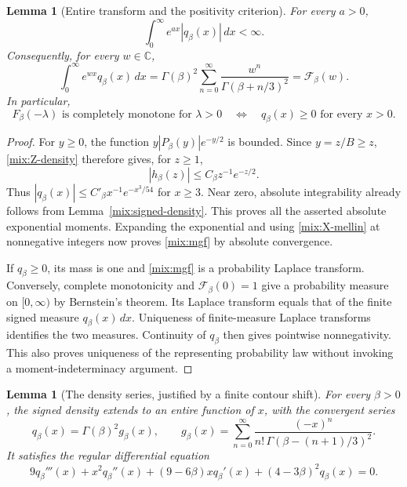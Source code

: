 \documentclass[11pt,a4paper]{article}
\numberwithin{equation}{section}
\newtheorem{lemma}[theorem]{Lemma}
\theoremstyle{definition}\newtheorem{definition}[theorem]{Definition}
\theoremstyle{remark}\newtheorem{remark}[theorem]{Remark}
\begin{document}
\begin{lemma}[Entire transform and the positivity criterion]
\label{mix:entire-transform}
For every \(a>0\),
\[
              \int_0^\infty e^{ax}|q_\beta(x)|\,dx<\infty.
\]
Consequently, for every \(w\in\mathbb C\),
\begin{equation}\label{mix:mgf}
 \int_0^\infty e^{wx}q_\beta(x)\,dx
       =\Gamma(\beta)^2\sum_{n=0}^{\infty}
              \frac{w^n}{\Gamma(\beta+n/3)^2}
       =\mathcal F_\beta(w).
\end{equation}
In particular,
\begin{equation}\label{mix:cm-criterion}
 F_\beta(-\lambda)\text{ is completely monotone for }\lambda>0
 \quad\Longleftrightarrow\quad
 q_\beta(x)\ge0\text{ for every }x>0.
\end{equation}
\end{lemma}

\begin{proof}
For \(y\ge0\), the function
\(y|P_\beta(y)|e^{-y/2}\) is bounded.  Since \(y=z/B\ge z\),
\eqref{mix:Z-density} therefore gives, for \(z\ge1\),
\[
        |h_\beta(z)|\le C_\beta z^{-1}e^{-z/2}.
\]
Thus \(|q_\beta(x)|\le C'_\beta x^{-1}e^{-x^3/54}\) for
\(x\ge3\).  Near zero, absolute integrability already follows
from Lemma~\ref{mix:signed-density}.  This proves all the asserted
absolute exponential moments.  Expanding the exponential and using
\eqref{mix:X-mellin} at nonnegative integers now proves
\eqref{mix:mgf} by absolute convergence.

If \(q_\beta\ge0\), its mass is one and
\eqref{mix:mgf} is a probability Laplace transform.  Conversely,
complete monotonicity and \(\mathcal F_\beta(0)=1\) give a probability
measure on \([0,\infty)\) by Bernstein's theorem.  Its Laplace
transform equals that of the finite signed measure
\(q_\beta(x)\,dx\).  Uniqueness of finite-measure Laplace transforms
identifies the two measures.  Continuity of \(q_\beta\) then gives
pointwise nonnegativity.  This also proves uniqueness of the
representing probability law without invoking a moment-indeterminacy
argument.
\end{proof}

\begin{lemma}[The density series, justified by a finite contour shift]
\label{mix:series-ode}
For every \(\beta>0\), the signed density extends to an entire
function of \(x\), with the convergent series
\begin{equation}\label{mix:density-series}
 q_\beta(x)=\Gamma(\beta)^2 g_\beta(x),
 \qquad
 g_\beta(x)=\sum_{n=0}^{\infty}
      \frac{(-x)^n}{n!\,\Gamma(\beta-(n+1)/3)^2}.
\end{equation}
It satisfies the regular differential equation
\begin{equation}\label{mix:ode}
 9q_\beta'''(x)+x^2q_\beta''(x)
        +(9-6\beta)xq_\beta'(x)+(4-3\beta)^2q_\beta(x)=0.
\end{equation}
\end{lemma}
\end{document}
